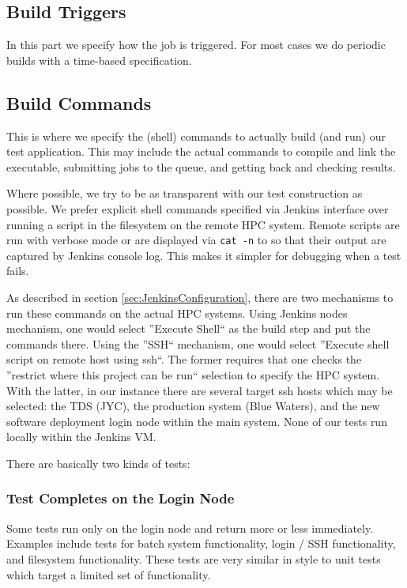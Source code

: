 \documentclass[10pt, conference, compsocconf]{IEEEtran}
\begin{document}
\subsection{Build Triggers}
In this part we specify how the job is triggered. 
For most cases we do periodic builds with a time-based specification.

\subsection{Build Commands}
This is where we specify the (shell) commands to actually build (and run) our test application. 
This may include the actual commands to compile and link the executable, submitting jobs to the queue, and getting back and checking results.

Where possible, we try to be as transparent with our test construction as possible. 
We prefer explicit shell commands specified via Jenkins interface over running a script in the filesystem on the remote HPC system. 
Remote scripts are run with verbose mode or are displayed via \texttt{cat -n} to so that their output are captured by Jenkins console log. 
This makes it simpler for debugging when a test fails.

As described in section \ref{sec:JenkinsConfiguration}, there are two mechanisms to run these commands on the actual HPC systems. 
Using Jenkins nodes mechanism, one would select ''Execute Shell`` as the build step and put the commands there. Using the ''SSH`` mechanism, one would select ''Execute shell script on remote host using ssh``. 
The former requires that one checks the ''restrict where this project can be run`` selection to specify the HPC system. 
With the latter, in our instance there are several target ssh hosts which may be selected: the TDS (JYC), the production system (Blue Waters), and the new software deployment login node within the main system. 
None of our tests run locally within the Jenkins VM.

There are basically two kinds of tests: 

\subsubsection{Test Completes on the Login Node}
Some tests run only on the login node and return more or less immediately. 
Examples include tests for batch system functionality, login / SSH functionality, and filesystem functionality. 
These tests are very similar in style to unit tests which target a limited set of functionality.
\end{document}

